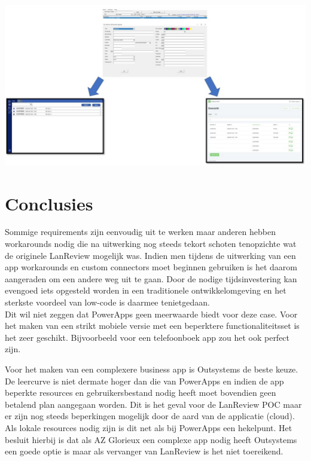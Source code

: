 \documentclass[a0,portrait]{a0poster}
\begin{document}
\begin{multicols}{2}
\begin{center}\vspace{1cm}
    \includegraphics[width=1.0\linewidth]{poc-tri}
\end{center}\vspace{1cm}




\color{HoGentAccent1} 
\section*{Conclusies}
\color{black}
Sommige requirements zijn eenvoudig uit te werken maar anderen hebben workarounds nodig die na uitwerking nog steeds tekort schoten tenopzichte wat de originele LanReview mogelijk was. Indien men tijdens de uitwerking van een app workarounds en custom connectors moet beginnen gebruiken is het daarom aangeraden om een andere weg uit te gaan. Door de nodige tijdsinvestering kan evengoed iets opgesteld worden in een traditionele ontwikkelomgeving en het sterkste voordeel van low-code is daarmee tenietgedaan.\\
Dit wil niet zeggen dat PowerApps geen meerwaarde biedt voor deze case. Voor het maken van een strikt mobiele versie met een beperktere functionaliteitsset is het zeer geschikt. Bijvoorbeeld voor een telefoonboek app zou het ook perfect zijn.

Voor het maken van een complexere business app is Outsystems de beste keuze. De leercurve is niet dermate hoger dan die van PowerApps en indien de app beperkte resources en gebruikersbestand nodig heeft moet bovendien geen betalend plan aangegaan worden. Dit is het geval voor de LanReview POC maar er zijn nog steeds beperkingen mogelijk door de aard van de applicatie (cloud). Als lokale resources nodig zijn is dit net als bij PowerApps een hekelpunt. Het besluit hierbij is dat als AZ Glorieux een complexe app nodig heeft Outsystems een goede optie is maar als vervanger van LanReview is het niet toereikend.


\end{multicols}
\end{document}
